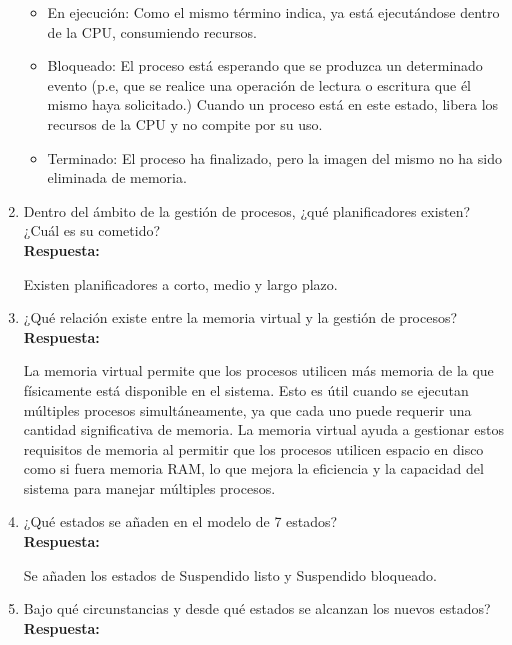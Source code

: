 \documentclass[a4paper,12pt]{article}
\begin{document}
\begin{enumerate}[label=\textbf{Pregunta \arabic*.}]
\begin{itemize}
    \item En ejecución: Como el mismo término indica, ya está ejecutándose dentro de la CPU, consumiendo recursos. 

    \item Bloqueado: El proceso está esperando que se produzca un determinado evento (p.e, que se realice una operación de lectura o escritura que él mismo haya solicitado.) Cuando un proceso está en este estado, libera los recursos de la CPU y no compite por su uso.

    \item Terminado: El proceso ha finalizado, pero la imagen del mismo no ha sido eliminada de memoria.

    \end{itemize}

    \item Dentro del ámbito de la gestión de procesos, ¿qué planificadores existen? ¿Cuál es su cometido? \\ %
    \textbf{Respuesta:} 
    
    Existen planificadores a corto, medio y largo plazo.


    \item ¿Qué relación existe entre la memoria virtual y la gestión de procesos? \\ %
    \textbf{Respuesta:} 

    La memoria virtual permite que los procesos utilicen más memoria de la que físicamente está disponible en el sistema. Esto es útil cuando se ejecutan múltiples procesos simultáneamente, ya que cada uno puede requerir una cantidad significativa de memoria. La memoria virtual ayuda a gestionar estos requisitos de memoria al permitir que los procesos utilicen espacio en disco como si fuera memoria RAM, lo que mejora la eficiencia y la capacidad del sistema para manejar múltiples procesos. 
    
    \item ¿Qué estados se añaden en el modelo de 7 estados? \\ %
    \textbf{Respuesta:}
    
    Se añaden los estados de Suspendido listo y Suspendido bloqueado.

    \item Bajo qué circunstancias y desde qué estados se alcanzan los nuevos estados? \\ %
    \textbf{Respuesta:} 
    
    \begin{itemize}
        

\end{itemize}
\end{enumerate}
\end{document}
